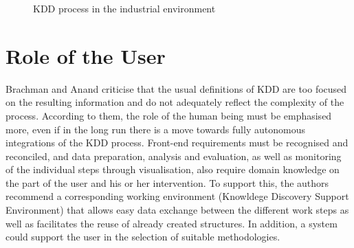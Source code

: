 \begin{figure} [H]
\begin{center}
  \caption{KDD process in the industrial environment}\label{KDDAnwendung}
\end{center}
\end{figure}


\section{Role of the User}

Brachman and Anand \cite{Brachman:1994} criticise that the usual definitions of KDD are too focused on the resulting information and do not adequately reflect the complexity of the process. According to them, the role of the human being must be emphasised more, even if in the long run there is a move towards fully autonomous integrations of the KDD process. Front-end requirements must be recognised and reconciled, and data preparation, analysis and evaluation, as well as monitoring of the individual steps through visualisation, also require domain knowledge on the part of the user and his or her intervention. To support this, the authors recommend a corresponding working environment (Knowldege Discovery Support Environment) that allows easy data exchange between the different work steps as well as facilitates the reuse of already created structures. In addition, a system could support the user in the selection of suitable methodologies.



